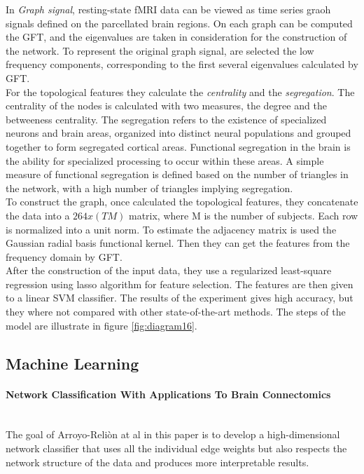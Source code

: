 In \textit{Graph signal}, resting-state fMRI data can be viewed as time series graoh signals defined on the parcellated brain regions. On each graph can be computed the GFT, and the eigenvalues are taken in consideration for the construction of the network. To represent the original graph signal, are selected the low frequency components, corresponding to the first several eigenvalues calculated by GFT. 
\\

For the topological features they calculate the \textit{centrality} and the \textit{segregation}. The centrality of the nodes is calculated with two measures, the degree and the betweeness centrality. The segregation refers to the existence of specialized neurons and brain areas, organized into distinct neural populations and grouped together to form segregated cortical areas. Functional segregation in the brain is the ability for specialized processing to occur within these areas. A simple measure of functional segregation is defined based on the number of triangles in the network, with a high number of triangles implying segregation.
\\

To construct the graph, once calculated the topological features, they concatenate the data into a $ 264 x (TM) $ matrix, where M is the number of subjects. Each row is normalized into a unit norm. To estimate the adjacency matrix is used the Gaussian radial basis functional kernel. Then they can get the features from the frequency domain by GFT. 
\\

After the construction of the input data, they use a regularized least-square regression using lasso algorithm for feature selection. The features are then given to a linear SVM classifier. The results of the experiment gives high accuracy, but they where not compared with other state-of-the-art methods. The steps of the model are illustrate in figure \ref{fig:diagram16}.

\subsection{Machine Learning}
\paragraph{Network Classification With Applications To Brain Connectomics}\
\\

The goal of Arroyo-Reliòn at al \cite{Arroyo_Reli_n_2019} in this paper is to develop a high-dimensional network classifier that uses all the individual edge weights but also respects the network structure of the data and produces more interpretable results. 
\\

